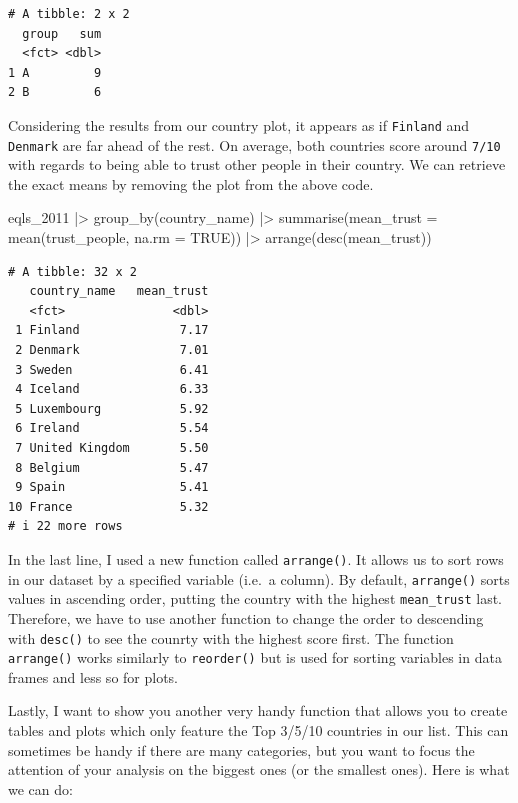 \documentclass[
  letterpaper,
]{krantz}
\makeatletter
\newenvironment{Shaded}{\begin{snugshade}}{\end{snugshade}}
\newcommand{\AttributeTok}[1]{\textcolor[rgb]{0.40,0.45,0.13}{#1}}
\newcommand{\ConstantTok}[1]{\textcolor[rgb]{0.56,0.35,0.01}{#1}}
\newcommand{\FunctionTok}[1]{\textcolor[rgb]{0.28,0.35,0.67}{#1}}
\newcommand{\NormalTok}[1]{\textcolor[rgb]{0.00,0.23,0.31}{#1}}
\newcommand{\SpecialCharTok}[1]{\textcolor[rgb]{0.37,0.37,0.37}{#1}}
\newenvironment{kframe}{%
\medskip{}
\setlength{\fboxsep}{.8em}
 \def\at@end@of@kframe{}%
 \ifinner\ifhmode%
  \def\at@end@of@kframe{\end{minipage}}%
  \begin{minipage}{\columnwidth}%
 \fi\fi%
 \def\FrameCommand##1{\hskip\@totalleftmargin \hskip-\fboxsep
 \colorbox{shadecolor}{##1}\hskip-\fboxsep
     \hskip-\linewidth \hskip-\@totalleftmargin \hskip\columnwidth}%
 \MakeFramed {\advance\hsize-\width
   \@totalleftmargin\z@ \linewidth\hsize
   \@setminipage}}%
 {\par\unskip\endMakeFramed%
 \at@end@of@kframe}
\renewenvironment{Shaded}{\begin{kframe}}{\end{kframe}}
\makeatother
\begin{document}
\begin{verbatim}
# A tibble: 2 x 2
  group   sum
  <fct> <dbl>
1 A         9
2 B         6
\end{verbatim}

Considering the results from our country plot, it appears as if
\texttt{Finland} and \texttt{Denmark} are far ahead of the rest. On
average, both countries score around \texttt{7/10} with regards to being
able to trust other people in their country. We can retrieve the exact
means by removing the plot from the above code.

\begin{Shaded}
\begin{Highlighting}[]
\NormalTok{eqls\_2011 }\SpecialCharTok{|\textgreater{}}
  \FunctionTok{group\_by}\NormalTok{(country\_name) }\SpecialCharTok{|\textgreater{}}
  \FunctionTok{summarise}\NormalTok{(}\AttributeTok{mean\_trust =} \FunctionTok{mean}\NormalTok{(trust\_people, }\AttributeTok{na.rm =} \ConstantTok{TRUE}\NormalTok{)) }\SpecialCharTok{|\textgreater{}}
  \FunctionTok{arrange}\NormalTok{(}\FunctionTok{desc}\NormalTok{(mean\_trust))}
\end{Highlighting}
\end{Shaded}

\begin{verbatim}
# A tibble: 32 x 2
   country_name   mean_trust
   <fct>               <dbl>
 1 Finland              7.17
 2 Denmark              7.01
 3 Sweden               6.41
 4 Iceland              6.33
 5 Luxembourg           5.92
 6 Ireland              5.54
 7 United Kingdom       5.50
 8 Belgium              5.47
 9 Spain                5.41
10 France               5.32
# i 22 more rows
\end{verbatim}

In the last line, I used a new function called \texttt{arrange()}. It
allows us to sort rows in our dataset by a specified variable (i.e.~a
column). By default, \texttt{arrange()} sorts values in ascending order,
putting the country with the highest \texttt{mean\_trust} last.
Therefore, we have to use another function to change the order to
descending with \texttt{desc()} to see the counrty with the highest
score first. The function \texttt{arrange()} works similarly to
\texttt{reorder()} but is used for sorting variables in data frames and
less so for plots.

Lastly, I want to show you another very handy function that allows you
to create tables and plots which only feature the Top 3/5/10 countries
in our list. This can sometimes be handy if there are many categories,
but you want to focus the attention of your analysis on the biggest ones
(or the smallest ones). Here is what we can do:
\end{document}
